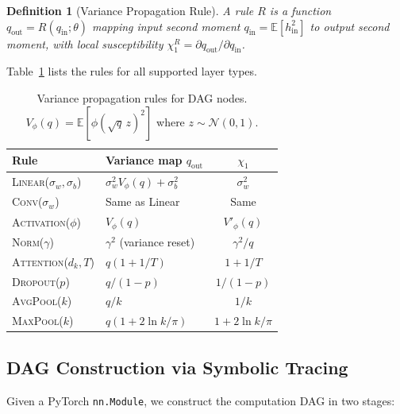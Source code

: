 \documentclass[10pt]{article}
\newcommand{\EE}{\mathbb{E}}
\newtheorem{definition}[theorem]{Definition}
\begin{document}
\begin{definition}[Variance Propagation Rule]
\label{def:var-rule}
A rule $R$ is a function $q_{\mathrm{out}} = R(q_{\mathrm{in}}; \theta)$ mapping input second moment $q_{\mathrm{in}} = \EE[h_{\mathrm{in}}^2]$ to output second moment, with local susceptibility $\chi_1^R = \partial q_{\mathrm{out}}/\partial q_{\mathrm{in}}$.
\end{definition}

Table~\ref{tab:rules} lists the rules for all supported layer types.

\begin{table}[t]
\centering
\caption{Variance propagation rules for DAG nodes. $V_\phi(q) = \EE[\phi(\sqrt{q}\,z)^2]$ where $z \sim \mathcal{N}(0,1)$.}
\label{tab:rules}
\small
\begin{tabular}{@{}llc@{}}
\toprule
\textbf{Rule} & \textbf{Variance map $q_{\mathrm{out}}$} & $\chi_1$ \\
\midrule
\textsc{Linear}($\sigma_w, \sigma_b$) & $\sigma_w^2 V_\phi(q) + \sigma_b^2$ & $\sigma_w^2$ \\
\textsc{Conv}($\sigma_w$) & Same as Linear & Same \\
\textsc{Activation}($\phi$) & $V_\phi(q)$ & $V'_\phi(q)$ \\
\textsc{Norm}($\gamma$) & $\gamma^2$ (variance reset) & $\gamma^2/q$ \\
\textsc{Attention}($d_k, T$) & $q(1 + 1/T)$ & $1 + 1/T$ \\
\textsc{Dropout}($p$) & $q/(1\!-\!p)$ & $1/(1\!-\!p)$ \\
\textsc{AvgPool}($k$) & $q/k$ & $1/k$ \\
\textsc{MaxPool}($k$) & $q(1 + 2\ln k/\pi)$ & $1+2\ln k/\pi$ \\
\bottomrule
\end{tabular}
\end{table}

\subsection{DAG Construction via Symbolic Tracing}

Given a PyTorch \texttt{nn.Module}, we construct the computation DAG in two stages:
\end{document}
